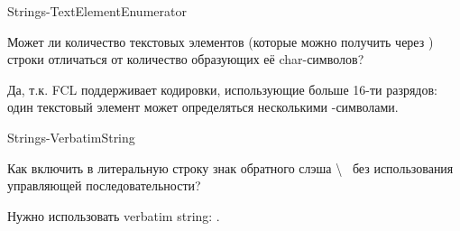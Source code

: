 \begin{defproblem}{Strings-TextElementEnumerator}
\begin{onlyproblem}
  Может ли количество текстовых элементов (которые можно получить через ) строки отличаться от количество образующих её char-символов?
\end{onlyproblem}
\begin{onlysolution}
  Да, т.к. FCL поддерживает кодировки, использующие больше 16-ти разрядов: один текстовый элемент может определяться несколькими -символами.
\end{onlysolution}
\end{defproblem}
\begin{defproblem}{Strings-VerbatimString}
\begin{onlyproblem}
  Как включить в литеральную строку знак обратного слэша \textbackslash~ без использования управляющей последовательности?
\end{onlyproblem}
\begin{onlysolution}
  Нужно использовать verbatim string: .
\end{onlysolution}
\end{defproblem}
